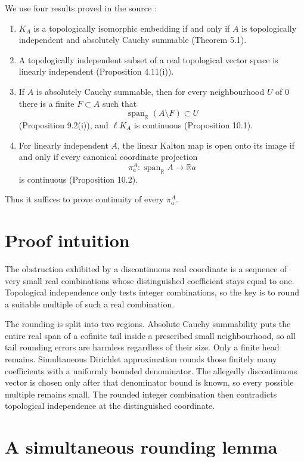 \documentclass[11pt]{article}
\newcommand{\R}{\mathbb{R}}
\newcommand{\spanR}{\operatorname{span}_{\R}}
\newcommand{\KA}{K_A}
\newcommand{\lKA}{\ell K_A}
\begin{document}
We use four results proved in the source \cite{DSS}:
\begin{enumerate}
\item $\KA$ is a topologically isomorphic embedding if and only if $A$ is
topologically independent and absolutely Cauchy summable (Theorem 5.1).
\item A topologically independent subset of a real topological vector space
is linearly independent (Proposition 4.11(i)).
\item If $A$ is absolutely Cauchy summable, then for every neighbourhood
$U$ of $0$ there is a finite $F\subset A$ such that
\begin{equation}\label{eq:tail}
   \spanR(A\setminus F)\subset U
\end{equation}
(Proposition 9.2(i)), and $\lKA$ is continuous (Proposition 10.1).
\item For linearly independent $A$, the linear Kalton map is open onto its
image if and only if every canonical coordinate projection
\[
  \pi^A_a:\spanR A\longrightarrow \R a
\]
is continuous (Proposition 10.2).
\end{enumerate}

Thus it suffices to prove continuity of every $\pi^A_a$.

\section{Proof intuition}

The obstruction exhibited by a discontinuous real coordinate is a sequence
of very small real combinations whose distinguished coefficient stays equal
to one. Topological independence only tests integer combinations, so the key
is to round a suitable multiple of such a real combination.

The rounding is split into two regions. Absolute Cauchy summability puts the
entire real span of a cofinite tail inside a prescribed small neighbourhood,
so all tail rounding errors are harmless regardless of their size. Only a
finite head remains. Simultaneous Dirichlet approximation rounds those finitely
many coefficients with a uniformly bounded denominator. The allegedly
discontinuous vector is chosen only after that denominator bound is known, so
every possible multiple remains small. The rounded integer combination then
contradicts topological independence at the distinguished coordinate.

\section{A simultaneous rounding lemma}
\end{document}
